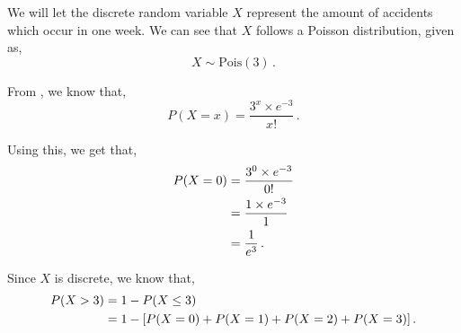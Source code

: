 %
%


\begin{subquestions}
	
\subquestion

We will let the discrete random variable $X$ represent the amount of accidents which occur in one week. We can see that $X$ follows a Poisson distribution, given as,
\begin{equation}
	X \sim \text{Pois}(3) \,.
\end{equation}
	
\begin{subsubquestions}
	
\subsubquestion

From , we know that,
\begin{equation}
	P(X = x) =\frac{ 3 ^ x \times e^{-3}}{x!} \,. \label{2011:q4:Poisson1}
\end{equation}
	
Using this, we get that,
\begin{align}
	P(X=0) & = \frac{ 3 ^0 \times e^{-3}}{0!} \nonumber \\
	       & = \frac{ 1 \times e^{-3}}{1} \nonumber \\
	       & = \frac{1}{e^3} \,.
\end{align}
	

\subsubquestion

Since $X$ is discrete, we know that,
\begin{align}
	P(X>3) & =1-P(X \leq 3) \nonumber \\
	       & = 1 - [P(X=0)+P(X=1)+P(X=2)+P(X=3)] \,. \label{2011:q4:Poisson2}
\end{align}


\end{subsubquestions}
\end{subquestions}
